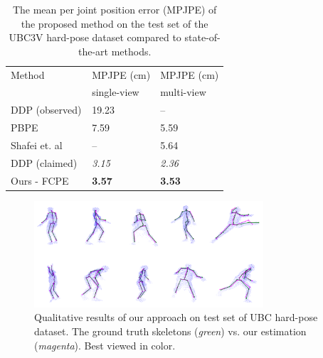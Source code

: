 \setlength{\tabcolsep}{4pt}
\begin{table}[H]
\begin{center}
\caption[Mean per joint position error on UBC3V hard-pose dataset, compared to state-of-the-art methods.]{The mean per joint position error (MPJPE) of the proposed method on the test set of the UBC3V hard-pose dataset compared to state-of-the-art methods.}
\label{table:UBC_results}
\begin{tabular}{lll}
\hline\noalign{\smallskip}
Method & MPJPE (cm) & MPJPE (cm) \\
& single-view & multi-view\\
\noalign{\smallskip}
\hline
\noalign{\smallskip}
DDP (observed) &  19.23 & –\\
PBPE~\cite{Ali19} & 7.59 & 5.59\\
Shafei et. al~\cite{Shafaei16} & – & 5.64\\
DDP (claimed)~\cite{Marin18jvcir} & {\it 3.15} & {\it 2.36}\\
\hline\noalign{\smallskip}
Ours - FCPE & {\bf 3.57} & {\bf 3.53}\\
\hline
\end{tabular}
\end{center}
\end{table}
\setlength{\tabcolsep}{1.4pt}


\begin{figure}[H]
\begin{center}
\centering
\includegraphics[height=150px]{images/results/UBC_results.png}
\caption[Qualitative results on test set of UBC hard-pose dataset.]{Qualitative results of our approach on test set of UBC hard-pose dataset. The ground truth skeletons ({\it green}) vs. our estimation ({\it magenta}). Best viewed in color.}
\label{fig:ubc_results}
\end{center}
\end{figure}


